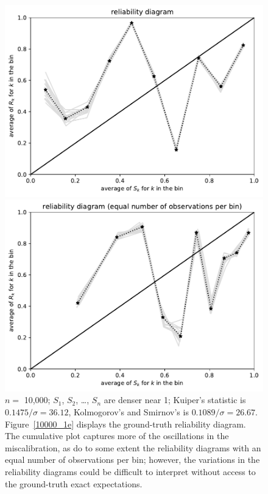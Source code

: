 \documentclass{article}
\begin{document}
\begin{figure}
\begin{centering}
\parbox{\imsize}{\includegraphics[width=\imsize]
                {./codes/unweighted/10000_10_2_1/equiprob.pdf}}
\quad\quad
\parbox{\imsize}{\includegraphics[width=\imsize]
                {./codes/unweighted/10000_10_2_1/equisamp.pdf}}

\end{centering}
\caption{$n =$ 10,000; $S_1$, $S_2$, \dots, $S_n$ are denser near 1;
         Kuiper's statistic is $0.1475 / \sigma = 36.12$,
         Kolmogorov's and Smirnov's is $0.1089 / \sigma = 26.67$.
Figure~\ref{10000_1e} displays the ground-truth reliability diagram.
The cumulative plot captures more of the oscillations in the miscalibration,
as do to some extent the reliability diagrams with an equal number
of observations per bin; however, the variations in the reliability diagrams
could be difficult to interpret without access
to the ground-truth exact expectations.
}
\label{10000_1}
\end{figure}
\end{document}
